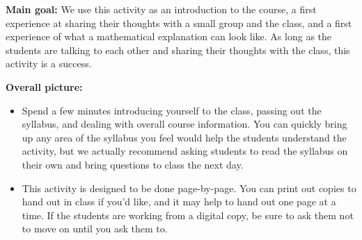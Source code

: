\documentclass[noauthor,nooutcomes]{ximera}
\begin{document}
\begin{instructorNotes}


{\bf Main goal:} We use this activity as an introduction to the course, a first experience at sharing their thoughts with a small group and the class, and a first experience of what a mathematical explanation can look like. As long as the students are talking to each other and sharing their thoughts with the class, this activity is a success.

{\bf Overall picture:} 
\begin{itemize}
	\item Spend a few minutes introducing yourself to the class, passing out the syllabus, and dealing with overall course information. You can quickly bring up any area of the syllabus you feel would help the students understand the activity, but we actually recommend asking students to read the syllabus on their own and bring questions to class the next day.
	\item This activity is designed to be done page-by-page. You can print out copies to hand out in class if you'd like, and it may help to hand out one page at a time. If the students are working from a digital copy, be sure to ask them not to move on until you ask them to.
\end{itemize}
	

\end{instructorNotes}
\end{document}
